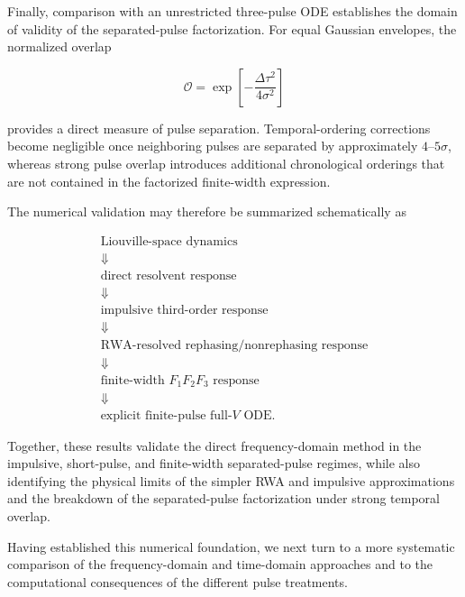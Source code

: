 \documentclass[11pt]{article}
\begin{document}
Finally, comparison with an unrestricted three-pulse ODE establishes
the domain of validity of the separated-pulse factorization.  For equal
Gaussian envelopes, the normalized overlap

\begin{equation}
\mathcal{O}
=
\exp\left[
-\frac{\Delta\tau^2}{4\sigma^2}
\right]
\end{equation}

provides a direct measure of pulse separation.  Temporal-ordering
corrections become negligible once neighboring pulses are separated by
approximately $4$--$5\sigma$, whereas strong pulse overlap introduces
additional chronological orderings that are not contained in the
factorized finite-width expression.

The numerical validation may therefore be summarized schematically as

\begin{equation}
\boxed{
\begin{gathered}
\text{Liouville-space dynamics}
\\
\Downarrow
\\
\text{direct resolvent response}
\\
\Downarrow
\\
\text{impulsive third-order response}
\\
\Downarrow
\\
\text{RWA-resolved rephasing/nonrephasing response}
\\
\Downarrow
\\
\text{finite-width }F_1F_2F_3\text{ response}
\\
\Downarrow
\\
\text{explicit finite-pulse full-}V\text{ ODE}.
\end{gathered}
}
\label{eq:numerical_validation_chain}
\end{equation}

Together, these results validate the direct frequency-domain method in
the impulsive, short-pulse, and finite-width separated-pulse regimes,
while also identifying the physical limits of the simpler RWA and
impulsive approximations and the breakdown of the separated-pulse
factorization under strong temporal overlap.

Having established this numerical foundation, we next turn to a more
systematic comparison of the frequency-domain and time-domain
approaches and to the computational consequences of the different
pulse treatments.

\end{document}
